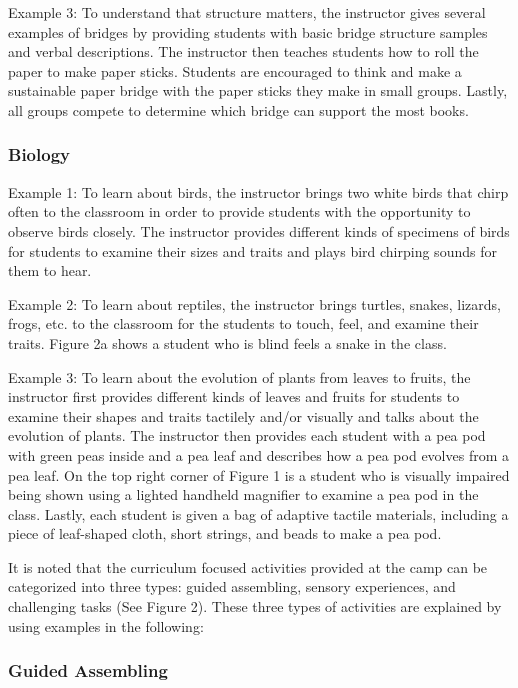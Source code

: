 \documentclass[11.5pt]{sig-alternate} %
\begin{document}
\begin{large}
Example 3: To understand that structure matters, the instructor gives several examples of bridges by providing students with basic bridge structure samples and verbal descriptions. The instructor then teaches students how to roll the paper to make paper sticks. Students are encouraged to think and make a sustainable paper bridge with the paper sticks they make in small groups. Lastly, all groups compete to determine which bridge can support the most books.

\subsubsection*{Biology}

Example 1: To learn about birds, the instructor brings two white birds that chirp often to the classroom in order to provide students with the opportunity to observe birds closely. The instructor provides different kinds of specimens of birds for students to examine their sizes and traits and plays bird chirping sounds for them to hear.

Example 2: To learn about reptiles, the instructor brings turtles, snakes, lizards, frogs, etc. to the classroom for the students to touch, feel, and examine their traits. Figure 2a shows a student who is blind feels a snake in the class.

Example 3: To learn about the evolution of plants from leaves to fruits, the instructor first provides different kinds of leaves and fruits for students to examine their shapes and traits tactilely and/or visually and talks about the evolution of plants. The instructor then provides each student with a pea pod with green peas inside and a pea leaf and describes how a pea pod evolves from a pea leaf. On the top right corner of Figure 1 is a student who is visually impaired being shown using a lighted handheld magnifier to examine a pea pod in the class. Lastly, each student is given a bag of adaptive tactile materials, including a piece of leaf-shaped cloth, short strings, and beads to make a pea pod.

It is noted that the curriculum focused activities provided at the camp can be categorized into three types: guided assembling, sensory experiences, and challenging tasks (See Figure 2). These three types of activities are explained by using examples in the following:

\subsubsection*{Guided Assembling}


\end{large}
\end{document}

